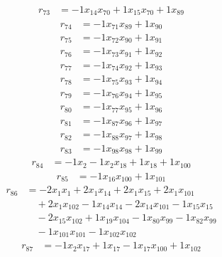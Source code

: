 \[\begin{aligned}
r_{73} &= - 1 x_{14} x_{70} + 1 x_{15} x_{70} + 1 x_{89}
\end{aligned}\]
\[\begin{aligned}
r_{74} &= - 1 x_{71} x_{89} + 1 x_{90}
\end{aligned}\]
\[\begin{aligned}
r_{75} &= - 1 x_{72} x_{90} + 1 x_{91}
\end{aligned}\]
\[\begin{aligned}
r_{76} &= - 1 x_{73} x_{91} + 1 x_{92}
\end{aligned}\]
\[\begin{aligned}
r_{77} &= - 1 x_{74} x_{92} + 1 x_{93}
\end{aligned}\]
\[\begin{aligned}
r_{78} &= - 1 x_{75} x_{93} + 1 x_{94}
\end{aligned}\]
\[\begin{aligned}
r_{79} &= - 1 x_{76} x_{94} + 1 x_{95}
\end{aligned}\]
\[\begin{aligned}
r_{80} &= - 1 x_{77} x_{95} + 1 x_{96}
\end{aligned}\]
\[\begin{aligned}
r_{81} &= - 1 x_{87} x_{96} + 1 x_{97}
\end{aligned}\]
\[\begin{aligned}
r_{82} &= - 1 x_{88} x_{97} + 1 x_{98}
\end{aligned}\]
\[\begin{aligned}
r_{83} &= - 1 x_{98} x_{98} + 1 x_{99}
\end{aligned}\]
\[\begin{aligned}
r_{84} &= - 1 x_{2} - 1 x_{2} x_{18} + 1 x_{18} + 1 x_{100}
\end{aligned}\]
\[\begin{aligned}
r_{85} &= - 1 x_{16} x_{100} + 1 x_{101}
\end{aligned}\]
\[\begin{aligned}
r_{86} &= - 2 x_{1} x_{1} + 2 x_{1} x_{14} + 2 x_{1} x_{15} + 2 x_{1} x_{101} \\
 &\quad + 2 x_{1} x_{102} - 1 x_{14} x_{14} - 2 x_{14} x_{101} - 1 x_{15} x_{15} \\
 &\quad - 2 x_{15} x_{102} + 1 x_{19} x_{104} - 1 x_{80} x_{99} - 1 x_{82} x_{99} \\
 &\quad - 1 x_{101} x_{101} - 1 x_{102} x_{102}
\end{aligned}\]
\[\begin{aligned}
r_{87} &= - 1 x_{2} x_{17} + 1 x_{17} - 1 x_{17} x_{100} + 1 x_{102}
\end{aligned}\]
